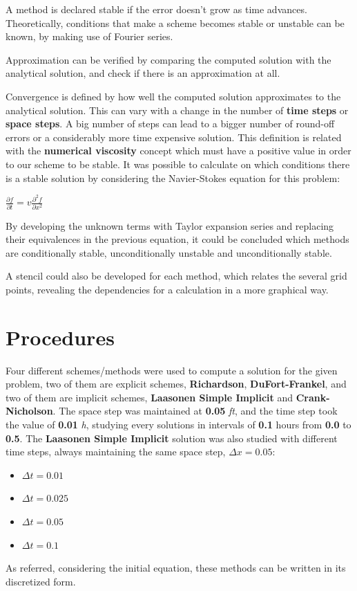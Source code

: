 \documentclass[12pt]{report}
\begin{document}
\par A method is declared stable if the error doesn't grow as time advances. Theoretically, conditions that make a scheme becomes stable or unstable can be known, by making use of Fourier series.
\par Approximation can be verified by comparing the computed solution with the analytical solution, and check if there is an approximation at all.
\par Convergence is defined by how well the computed solution approximates to the analytical solution. This can vary with a change in the number of \textbf{time steps} or \textbf{space steps}. A big number of steps can lead to a bigger number of round-off errors or a considerably more time expensive solution. This definition is related with the \textbf{numerical viscosity} concept which must have a positive value in order to our scheme to be stable. It was possible to calculate on which conditions there is a stable solution by considering the Navier-Stokes equation for this problem:
\begin{center}
\large
$
\frac{\partial f}{\partial t} = v\frac{\partial ^2f}{\partial x ^2}
$
\end{center}
\par By developing the unknown terms with Taylor expansion series and replacing their equivalences in the previous equation, it could be concluded which methods are conditionally stable, unconditionally unstable and unconditionally stable.
\par A stencil could also be developed for each method, which relates the several grid points, revealing the dependencies for a calculation in a more graphical way. 

\section*{Procedures}
Four different schemes/methods were used to compute a solution for the given problem, two of them are explicit schemes, \textbf{Richardson}, \textbf{DuFort-Frankel}, and two of them are implicit schemes, \textbf{Laasonen Simple Implicit} and \textbf{Crank-Nicholson}. The space step was maintained at \textbf{0.05} \textit{ft}, and the time step took the value of \textbf{0.01} \textit{h}, studying every solutions in intervals of \textbf{0.1} hours from \textbf{0.0} to \textbf{0.5}. The \textbf{Laasonen Simple Implicit} solution was also studied with different time steps, always maintaining the same space step,  \textbf{$\Delta x = 0.05$}:
\begin{itemize}[noitemsep] 
\item $ \Delta t = 0.01 $
\item $ \Delta t = 0.025 $
\item $ \Delta t = 0.05 $
\item $ \Delta t = 0.1 $
\end{itemize}
As referred, considering the initial equation, these methods can be written in its discretized form.
\end{document}
